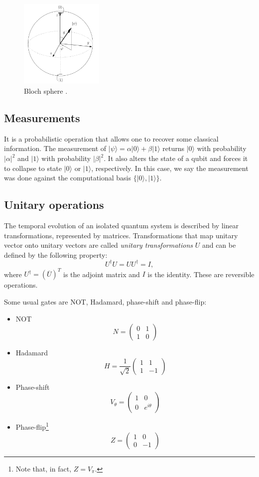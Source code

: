 \documentclass[a4paper, 10pt]{article}
\numberwithin{equation}{section}
\numberwithin{figure}{section}
\numberwithin{table}{section}
\begin{document}
\begin{figure}[h!]
	\centering
	\includegraphics[width=4cm]{Figures/bloch}
	\caption{Bloch sphere \cite{portugal}.}
\end{figure}

\subsection{Measurements}
It is a probabilistic operation that allows one to recover some classical information. The measurement of $|\psi\rangle = \alpha|0\rangle + \beta|1\rangle$ returns $|0\rangle$ with probability $|\alpha|^2$ and $|1\rangle$ with probability $|\beta|^2$. It also alters the state of a qubit and forces it to collapse to state $|0\rangle$ or $|1\rangle$, respectively. In this case, we say the measurement was done against the computational basis $\{|0\rangle,|1\rangle\}$.

\subsection{Unitary operations}
The temporal evolution of an isolated quantum system is described by linear transformations, represented by matrices. Transformations that map unitary vector onto unitary vectors are called \textit{unitary transformations} $U$ and can be defined by the following property:
$$ U^{\dagger}U = UU^{\dagger} = I, $$
where $U^{\dagger} = \left(\overline{U}\right)^T$ is the adjoint matrix and $I$ is the identity. These are reversible operations. 

Some usual gates are NOT, Hadamard, phase-shift and phase-flip:

\begin{itemize}
	\item NOT
	$$ N = \begin{pmatrix}
	0 & 1\\
	1 & 0
	\end{pmatrix} $$
	\item Hadamard
	$$ H = \frac{1}{\sqrt{2}}\begin{pmatrix}
	1 & 1\\
	1 & -1
	\end{pmatrix} $$
	\item Phase-shift
	$$ V_\theta = \begin{pmatrix}
	1 & 0\\
	0 & e^{i\theta}
	\end{pmatrix} $$
	\item Phase-flip\footnote{Note that, in fact, $Z=V_\pi$.}
	$$ Z = \begin{pmatrix}
	1 & 0\\
	0 & -1
	\end{pmatrix} $$
\end{itemize}
\end{document}
